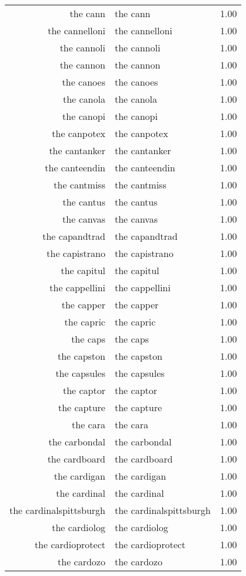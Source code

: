 \begin{table}[ht]
\begin{tabular}{rlr}
  the cann & the cann & 1.00 \\ 
  the cannelloni & the cannelloni & 1.00 \\ 
  the cannoli & the cannoli & 1.00 \\ 
  the cannon & the cannon & 1.00 \\ 
  the canoes & the canoes & 1.00 \\ 
  the canola & the canola & 1.00 \\ 
  the canopi & the canopi & 1.00 \\ 
  the canpotex & the canpotex & 1.00 \\ 
  the cantanker & the cantanker & 1.00 \\ 
  the canteendin & the canteendin & 1.00 \\ 
  the cantmiss & the cantmiss & 1.00 \\ 
  the cantus & the cantus & 1.00 \\ 
  the canvas & the canvas & 1.00 \\ 
  the capandtrad & the capandtrad & 1.00 \\ 
  the capistrano & the capistrano & 1.00 \\ 
  the capitul & the capitul & 1.00 \\ 
  the cappellini & the cappellini & 1.00 \\ 
  the capper & the capper & 1.00 \\ 
  the capric & the capric & 1.00 \\ 
  the caps & the caps & 1.00 \\ 
  the capston & the capston & 1.00 \\ 
  the capsules & the capsules & 1.00 \\ 
  the captor & the captor & 1.00 \\ 
  the capture & the capture & 1.00 \\ 
  the cara & the cara & 1.00 \\ 
  the carbondal & the carbondal & 1.00 \\ 
  the cardboard & the cardboard & 1.00 \\ 
  the cardigan & the cardigan & 1.00 \\ 
  the cardinal & the cardinal & 1.00 \\ 
  the cardinalspittsburgh & the cardinalspittsburgh & 1.00 \\ 
  the cardiolog & the cardiolog & 1.00 \\ 
  the cardioprotect & the cardioprotect & 1.00 \\ 
  the cardozo & the cardozo & 1.00 \\ 

\end{tabular}
\end{table}
